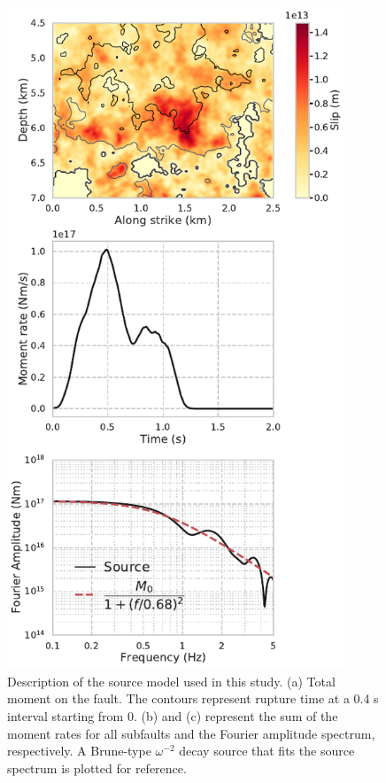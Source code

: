 \clearpage
\begin{figure}[!ht]
  \centering
  \includegraphics[width=0.9\textwidth,height=0.9\textheight,keepaspectratio]{figures/figure_vs30_2.pdf}
  \caption{Description of the source model used in this study. (a) Total moment on the fault. The contours represent rupture time at a 0.4 s interval starting from 0. (b) and (c) represent the sum of the moment rates for all subfaults and the Fourier amplitude spectrum, respectively.  A Brune-type $\omega^{-2}$ decay source \citep{brune1970tectonic} that fits the source spectrum is plotted for reference.}
  \label{fig:vs30-2}
\end{figure}

